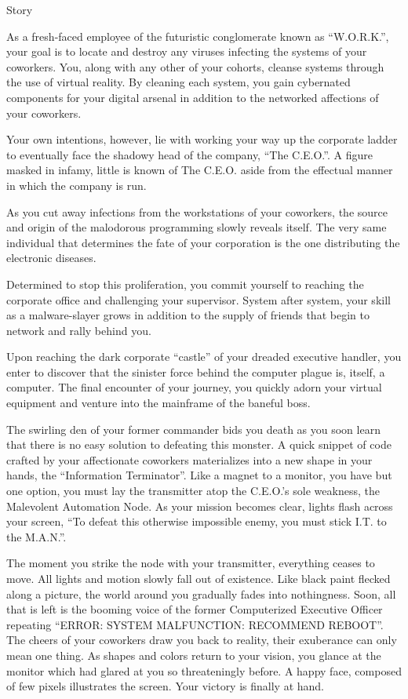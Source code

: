 \documentclass[12pt]{report}
\begin{document}
\begin{section}{Story}

As a fresh-faced employee of the futuristic conglomerate known as
``W.O.R.K.'', your goal is to locate and destroy any viruses infecting the
systems of your coworkers. You, along with any other of your cohorts,
cleanse systems through the use of virtual reality. By cleaning each system,
you gain cybernated components for your digital arsenal in addition to 
the networked affections of your coworkers.

Your own intentions, however, lie with working your way up the corporate
ladder to eventually face the shadowy head of the company, ``The C.E.O.''.
A figure masked in infamy, little is known of The C.E.O. aside from the
effectual manner in which the company is run.

As you cut away infections from the workstations of your coworkers, the
source and origin of the malodorous programming slowly reveals itself. The
very same individual that determines the fate of your corporation is the one
distributing the electronic diseases.

Determined to stop this proliferation, you commit yourself to reaching the
corporate office and challenging your supervisor. System after system, your
skill as a malware-slayer grows in addition to the supply of friends that
begin to network and rally behind you.

Upon reaching the dark corporate ``castle'' of your dreaded executive
handler, you enter to discover that the sinister force behind the computer
plague is, itself, a computer. The final encounter of your journey, you
quickly adorn your virtual equipment and venture into the mainframe of the
baneful boss.

The swirling den of your former commander bids you death as you soon learn
that there is no easy solution to defeating this monster. A quick snippet of
code crafted by your affectionate coworkers materializes into a new shape
in your hands, the ``Information Terminator''. Like a magnet to a monitor,
you have but one option, you must lay the transmitter atop the C.E.O.'s 
sole weakness, the Malevolent Automation Node. As your mission becomes
clear, lights flash across your screen, ``To defeat this otherwise
impossible enemy, you must stick I.T. to the M.A.N.''.

The moment you strike the node with your transmitter, everything ceases to
move. All lights and motion slowly fall out of existence. Like black paint
flecked along a picture, the world around you gradually fades into
nothingness. Soon, all that is left is the booming voice of the former 
Computerized Executive Officer repeating ``ERROR: SYSTEM MALFUNCTION:
RECOMMEND REBOOT''. The cheers of your coworkers draw you back to reality,
their exuberance can only mean one thing. As shapes and colors return to
your vision, you glance at the monitor which had glared at you so
threateningly before. A happy face, composed of few pixels illustrates the
screen. Your victory is finally at hand.
\end{section}

\end{document}
